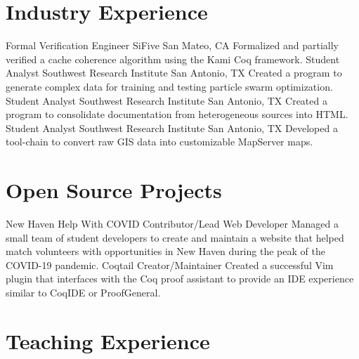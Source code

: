 \documentclass[10pt,letterpaper,sans]{moderncv}
\begin{document}
\section{Industry Experience}

        {Formal Verification Engineer}
        {SiFive}
        {San Mateo, CA}
        {}
        {%
          Formalized and partially verified a cache coherence algorithm using
          the Kami Coq framework.
        }
        {Student Analyst}
        {Southwest Research Institute}
        {San Antonio, TX}
        {}
        {%
          Created a program to generate complex data for training and testing
          particle swarm optimization.
        }
        {Student Analyst}
        {Southwest Research Institute}
        {San Antonio, TX}
        {}
        {%
          Created a program to consolidate documentation from heterogeneous
          sources into HTML.\@
        }
        {Student Analyst}
        {Southwest Research Institute}
        {San Antonio, TX}
        {}
        {%
          Developed a tool-chain to convert raw GIS data into customizable
          MapServer maps.
        }

\section{Open Source Projects}

        {New Haven Help With COVID}
        {Contributor/Lead Web Developer}
        {
        }
        {}
        {%
          Managed a small team of student developers to create and maintain a
          website that helped match volunteers with opportunities in New Haven
          during the peak of the COVID-19 pandemic.
        }
        {Coqtail}
        {Creator/Maintainer}
        {}
        {}
        {%
          Created a successful Vim plugin that interfaces with the Coq proof
          assistant to provide an IDE experience similar to CoqIDE or ProofGeneral.
        }

\section{Teaching Experience}
\end{document}
